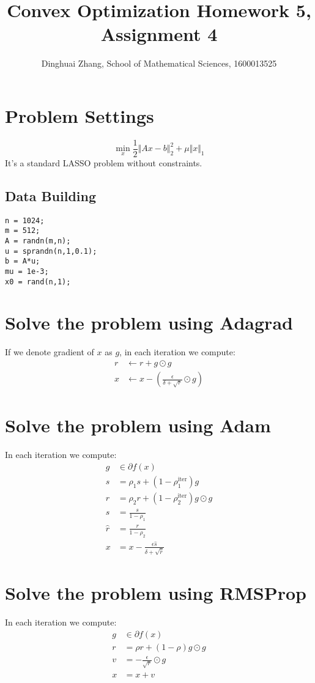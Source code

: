 \documentclass[11pt, oneside]{article}   	%
\title{Convex Optimization Homework 5, Assignment 4}
\author{Dinghuai Zhang, School of Mathematical Sciences, 1600013525}
\date{}							%
\begin{document}
\maketitle
\section{Problem Settings}
\begin{equation}
\min_x \frac{1}{2}\Vert Ax-b\Vert^2_2+\mu\Vert x\Vert_1
\end{equation}
It's a standard LASSO problem without constraints.
\subsection{Data Building}
\lstset{
 frame=single, 
breaklines=true,
language=MATLAB,
 }
\begin{lstlisting}
n = 1024;
m = 512;
A = randn(m,n);
u = sprandn(n,1,0.1);
b = A*u;
mu = 1e-3;
x0 = rand(n,1);
\end{lstlisting}

\section{Solve the problem using Adagrad}
If we denote gradient of $x$ as $g$, in each iteration we compute:
\begin{align} 
r & \gets r + g \odot g \\ 
x & \gets x  - \left(\frac{\epsilon}{\delta + \sqrt{r}} \odot g \right) 
 \end{align}

\section{Solve the problem using Adam}
In each iteration we compute:
\begin{align} 
g & \in \partial f \left( x  \right) \\ 
s & = \rho_1 s + (1-\rho_1^{\textrm{iter}})g\\
r & = \rho_2 r + (1-\rho_2^{\textrm{iter}}) g \odot g\\
\hat{s} & = \frac{s}{1 - \rho_1}\\
\hat{r} & = \frac{r}{1 - \rho_2}\\
x & = x  - \frac{\epsilon \hat{s}}{\delta + \sqrt{\hat{r}}}
\end{align}

\section{Solve the problem using RMSProp}
In each iteration we compute:
\begin{align} 
g & \in \partial f(x)\\
r & = \rho r  + (1-\rho) g \odot g\\
v &= - \frac{\epsilon}{\sqrt{r}}\odot g\\
x & = x  + v
\end{align}
\end{document}
